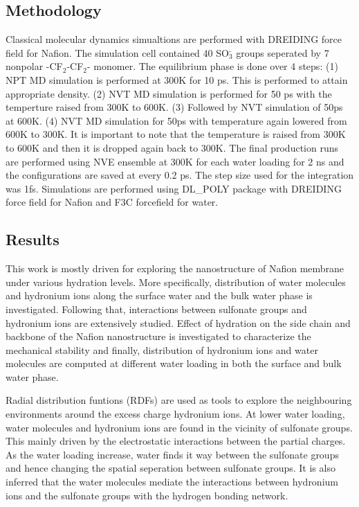 \documentclass{article}
\begin{document}
\subsection{Methodology}
\label{sec-1-2}
Classical molecular dynamics simualtions are performed with DREIDING force field for Nafion. The simulation cell contained 40 SO$_{\text{3}}^{\text{-}}$ groups seperated by 7 nonpolar -CF$_{\text{2}}$-CF$_{\text{2}}$- monomer. The equilibrium phase is done over 4 steps: (1) NPT MD simulation is performed at 300K for 10 ps. This is performed to attain appropriate density. (2) NVT MD simulation is performed for 50 ps with the temperture raised from 300K to 600K. (3) Followed by NVT simulation of 50ps at 600K. (4) NVT MD simulation for 50ps with temperature again lowered from 600K to 300K. It is important to note that the temperature is raised from 300K to 600K and then it is dropped again back to 300K. The final production runs are performed using NVE ensemble at 300K for each water loading for 2 ns  and the configurations are saved at every 0.2 ps. The step size used for the integration was 1fs. Simulations are performed using DL\_POLY package with DREIDING force field for Nafion and F3C forcefield for water.

\subsection{Results}
\label{sec-1-3}
This work is mostly driven for exploring the nanostructure of Nafion membrane under various hydration levels. More specifically, distribution of water molecules and hydronium ions along the surface water and the bulk water phase is investigated. Following that, interactions between sulfonate groups and hydronium ions are extensively studied. Effect of hydration on the side chain and backbone of the Nafion nanostructure is investigated to characterize the mechanical stability and finally, distribution of hydronium ions and water molecules are computed at different water loading in both the surface and bulk water phase.

Radial distribution funtions (RDFs) are used as tools to explore the neighbouring environments around the excess charge hydronium ions. At lower water loading, water molecules and hydronium ions are found in the vicinity of sulfonate groups. This mainly driven by the electrostatic interactions between the partial charges. As the water loading increase, water finds it way between the sulfonate groups and hence changing the spatial seperation between sulfonate groups. It is also inferred that the water molecules mediate the interactions between hydronium ions and the sulfonate groups with the hydrogen bonding network. 
\end{document}
